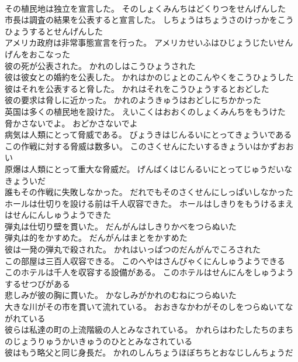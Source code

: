 \documentclass[8pt]{extreport}
\begin{document}
\begin{CJK}{UTF8}{min}
\\	その植民地は独立を宣言した。	そのしょくみんちはどくりつをせんげんした 
\\	市長は調査の結果を公表すると宣言した。	しちょうはちょうさのけっかをこうひょうするとせんげんした 
\\	アメリカ政府は非常事態宣言を行った。	アメリカせいふはひじょうじたいせんげんをおこなった 
\\	彼の死が公表された。	かれのしはこうひょうされた 
\\	彼は彼女との婚約を公表した。	かれはかのじょとのこんやくをこうひょうした 
\\	彼はそれを公表すると脅した。	かれはそれをこうひょうするとおどした 
\\	彼の要求は脅しに近かった。	かれのようきゅうはおどしにちかかった 
\\	英国は多くの植民地を設けた。	えいこくはおおくのしょくみんちをもうけた 
\\	脅かさないでよ。	おどかさないでよ 
\\	病気は人類にとって脅威である。	びょうきはじんるいにとってきょういである 
\\	この作戦に対する脅威は数多い。	このさくせんにたいするきょういはかずおおい 
\\	原爆は人類にとって重大な脅威だ。	げんばくはじんるいにとってじゅうだいなきょういだ 
\\	誰もその作戦に失敗しなかった。	だれでもそのさくせんにしっぱいしなかった 
\\	ホールは仕切りを設ける前は千人収容できた。	ホールはしきりをもうけるまえはせんにんしゅうようできた 
\\	弾丸は仕切り壁を貫いた。	だんがんはしきりかべをつらぬいた 
\\	弾丸は的をかすめた。	だんがんはまとをかすめた 
\\	彼は一発の弾丸で殺された。	かれはいっぱつのだんがんでころされた 
\\	この部屋は三百人収容できる。	このへやはさんびゃくにんしゅうようできる 
\\	このホテルは千人を収容する設備がある。	このホテルはせんにんをしゅうようするせつびがある 
\\	悲しみが彼の胸に貫いた。	かなしみがかれのむねにつらぬいた 
\\	大きな川がその市を貫いて流れている。	おおきなかわがそのしをつらぬいてながれている 
\\	彼らは私達の町の上流階級の人とみなされている。	かれらはわたしたちのまちのじょうりゅうかいきゅうのひととみなされている 
\\	彼はもう略父と同じ身長だ。	かれのしんちょうほぼちちとおなじしんちょうだ 

\end{CJK}
\end{document}
